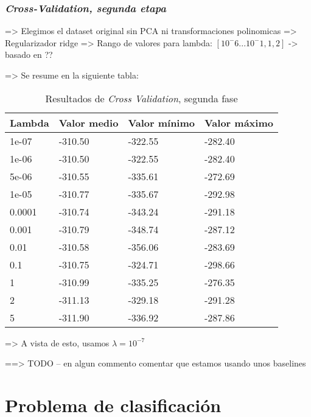 \documentclass[11pt]{article}
\begin{document}
\subsubsection{\emph{Cross-Validation, segunda etapa}}

=> Elegimos el dataset original sin PCA ni transformaciones polinomicas
=> Regularizador ridge
=> Rango de valores para lambda: $[10^-6 ... 10^-1, 1, 2]$ -> basado en ??

=> Se resume en la siguiente tabla:

\begin{table}[H]
\begin{tabularx}{\textwidth}{|X|X|X|X|}
    \hline
    \textbf{Lambda} & \textbf{Valor medio} & \textbf{Valor mínimo} & \textbf{Valor máximo} \\
    \hline
    1e-07 & -310.50 &  -322.55 & -282.40 \\
    1e-06 & -310.50 &  -322.55 & -282.40 \\
    5e-06 & -310.55 &  -335.61 & -272.69 \\
    1e-05 & -310.77 &  -335.67 & -292.98 \\
    0.0001 & -310.74 &  -343.24 & -291.18 \\
    0.001 & -310.79 &  -348.74 & -287.12 \\
    0.01 & -310.58 &  -356.06 & -283.69 \\
    0.1 & -310.75 &  -324.71 & -298.66 \\
    1 & -310.99 &  -335.25 & -276.35 \\
    2 & -311.13 &  -329.18 & -291.28 \\
    5 & -311.90 &  -336.92 & -287.86 \\
    \hline
\end{tabularx}
    \caption{Resultados de \emph{Cross Validation}, segunda fase}
\end{table}

=> A vista de esto, usamos $\lambda = 10^{-7}$


==> TODO -- en algun commento comentar que estamos usando unos baselines
\pagebreak
\section{Problema de clasificación}

\pagebreak



\end{document}
